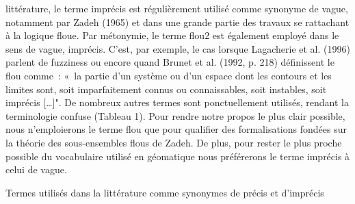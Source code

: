 littérature, le terme imprécis est régulièrement utilisé comme
synonyme de vague, notamment par Zadeh (1965) et dans une grande
partie des travaux se rattachant à la logique floue. Par métonymie, le
terme flou2 est également employé dans le sens de vague,
imprécis. C’est, par exemple, le cas lorsque Lagacherie et al.  (1996)
parlent de fuzziness ou encore quand Brunet et al. (1992, p. 218)
définissent le flou comme : « la partie d’un système ou d’un espace
dont les contours et les limites sont, soit imparfaitement connus ou
connaissables, soit instables, soit imprécis […]". De nombreux autres
termes sont ponctuellement utilisés, rendant la terminologie confuse
(Tableau 1). Pour rendre notre propos le plus clair possible, nous
n’emploierons le terme flou que pour qualifier des formalisations
fondées sur la théorie des sous-ensembles flous de Zadeh. De plus,
pour rester le plus proche possible du vocabulaire utilisé en
géomatique nous préférerons le terme imprécis à celui de vague.

\begin{table}
  \centering
  
  \caption{Termes utilisés dans la littérature comme synonymes de
    précis et d’imprécis}
  \label{tab:termes_vague}
\end{table}

